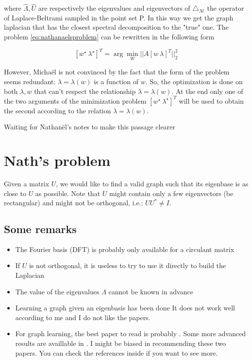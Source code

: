 where $\hat{\Lambda}, \hat{U}$ are respectively the eigenvalues and eigenvectors of $\triangle_\mathcal M$ the operator of Laplace-Beltrami sampled in the point set P. In this way we get the graph laplacian that has the closest spectral decomposition to the "true" one. The problem \ref{eq:nathanaelsproblem} can be rewritten in the following form 

\begin{equation}\label{eq:nathanaelsproblem2}
[w^\star\ \lambda^\star]^T = \arg\min_W||A[w\ \lambda]^T||_2^2
\end{equation}

However, Micha\"el is not convinced by the fact that the form of the problem seems redundant: $\lambda=\lambda(w)$ is a function of $w$. So, the optimization is done on both $\lambda, w$ that can't respect the relationship $\lambda=\lambda(w)$. At the end only one of the two arguments of the minimization problem $[w^\star\ \lambda^\star]^T$ will be used to obtain the second according to the relation $\lambda=\lambda(w)$.

Waiting for Nathan\"el's notes to make this passage clearer


\section{Nath's problem}

Given a matrix $U$, we would like to find a valid graph such that
its eigenbase is as close to $U$ as possible. Note that $U$ might
contain only a few eigenvectors (be rectangular) and might not be
orthogonal, i.e.: $UU^{*}\neq I$.

\subsection{Some remarks}
\begin{itemize}
	\item The Fourier basis (DFT) is probably only available for a circulant
	matrix
	\item If $U$ is not orthogonal, it is useless to try to use it directly
	to build the Laplacian
	\item The value of the eigenvalues $\Lambda$ cannot be known in advance
	\item Learning a graph given an eigenbasis has been done \cite{pasdeloup2018characterization,shafipour2017network}
	It does not work well according to me and I do not like the papers.
	\item For graph learning, the best paper to read is probably \cite{kalofolias2016learn}.
	Some more advanced results are availlable in \cite{kalofolias2018large}.
	I might be biased in recommending these two papers. You can check
	the references inside if you want to see more.
\end{itemize}

